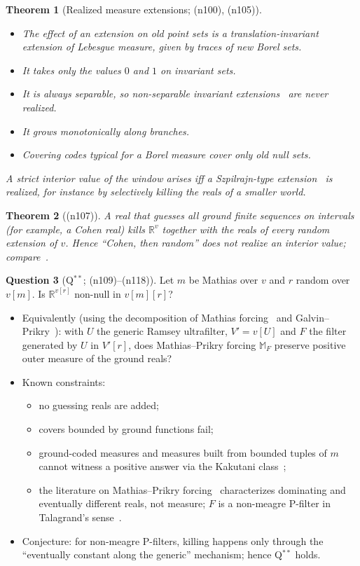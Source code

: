 \documentclass[11pt]{article}
\newtheorem{theorem}{Theorem}[section]
\theoremstyle{definition}
\newtheorem{question}[theorem]{Question}
\theoremstyle{remark}
\newcommand{\R}{\mathbb{R}}
\newcommand{\note}[1]{\textsf{(n#1)}}
\begin{document}
\begin{theorem}[Realized measure extensions; \note{100}, \note{105}]
\leavevmode
\begin{itemize}
\item The effect of an extension on old point sets is a translation-invariant extension of Lebesgue measure, given by traces of new Borel sets.
\item It takes only the values $0$ and $1$ on invariant sets.
\item It is always \emph{separable}, so non-separable invariant extensions~\cite{KakutaniOxtoby50} are never realized.
\item It grows monotonically along branches.
\item Covering codes typical for a Borel measure cover only old null sets.
\end{itemize}
A strict interior value of the window arises iff a Szpilrajn-type extension~\cite{Szpilrajn35} is realized, for instance by selectively killing the reals of a smaller world.
\end{theorem}

\begin{theorem}[\note{107}]
A real that guesses all ground finite sequences on intervals (for example, a Cohen real) kills $\R^v$ together with the reals of every random extension of $v$. Hence ``Cohen, then random'' does not realize an interior value; compare~\cite{Pawlikowski86}.
\end{theorem}

\begin{question}[Q$^{**}$; \note{109}--\note{118}]
Let $m$ be Mathias over $v$ and $r$ random over $v[m]$. Is $\R^{v[r]}$ non-null in $v[m][r]$?
\begin{itemize}
\item Equivalently (using the decomposition of Mathias forcing~\cite{Mathias77} and Galvin--Prikry~\cite{GalvinPrikry73}): with $U$ the generic Ramsey ultrafilter, $V'=v[U]$ and $F$ the filter generated by $U$ in $V'[r]$, does Mathias--Prikry forcing $\mathbb{M}_F$ preserve positive outer measure of the ground reals?
\item Known constraints:
  \begin{itemize}
  \item no guessing reals are added;
  \item covers bounded by ground functions fail;
  \item ground-coded measures and measures built from bounded tuples of $m$ cannot witness a positive answer via the Kakutani class~\cite{Kakutani48};
  \item the literature on Mathias--Prikry forcing~\cite{HrusakMinami14} characterizes dominating and eventually different reals, not measure; $F$ is a non-meagre P-filter in Talagrand's sense~\cite{Talagrand80}.
  \end{itemize}
\item Conjecture: for non-meagre P-filters, killing happens only through the ``eventually constant along the generic'' mechanism; hence Q$^{**}$ holds.
\end{itemize}
\end{question}
\end{document}
